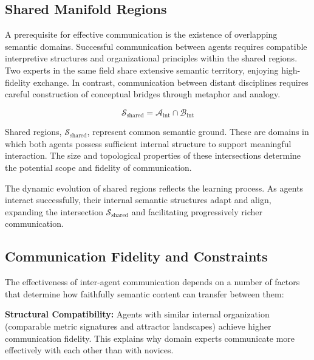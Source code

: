 
\subsection{Shared Manifold Regions}
\label{14.3.4:shared_manifold_regions}

A prerequisite for effective communication is the existence of overlapping semantic domains. Successful communication between agents requires compatible interpretive structures and organizational principles within the shared regions. Two experts in the same field share extensive semantic territory, enjoying high-fidelity exchange. In contrast, communication between distant disciplines requires careful construction of conceptual bridges through metaphor and analogy.

\begin{equation}
\mathcal{S}_{\mathrm{shared}} = \mathcal{A}_{\mathrm{int}} \cap \mathcal{B}_{\mathrm{int}}
\end{equation}

Shared regions, \(\mathcal{S}_{\mathrm{shared}}\), represent common semantic ground. These are domains in which both agents possess sufficient internal structure to support meaningful interaction. The size and topological properties of these intersections determine the potential scope and fidelity of communication.

The dynamic evolution of shared regions reflects the learning process. As agents interact successfully, their internal semantic structures adapt and align, expanding the intersection \(\mathcal{S}_{\mathrm{shared}}\) and facilitating progressively richer communication.


\subsection{Communication Fidelity and Constraints}
\label{14.3.5:communication_fidelity_and_constraints}

The effectiveness of inter-agent communication depends on a number of factors that determine how faithfully semantic content can transfer between them:

\textbf{Structural Compatibility:} Agents with similar internal organization (comparable metric signatures and attractor landscapes) achieve higher communication fidelity. This explains why domain experts communicate more effectively with each other than with novices.

